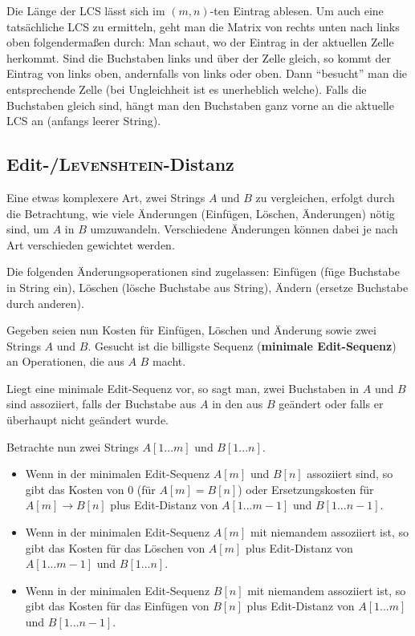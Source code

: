 \linie

Die Länge der LCS lässt sich im $(m, n)$-ten Eintrag ablesen.
Um auch eine tatsächliche LCS zu ermitteln, geht man die Matrix von rechts
unten nach links oben folgendermaßen durch:
Man schaut, wo der Eintrag in der aktuellen Zelle herkommt.
Sind die Buchstaben links und über der Zelle gleich, so kommt der Eintrag
von links oben, andernfalls von links oder oben.
Dann "`besucht"' man die entsprechende Zelle (bei Ungleichheit ist es
unerheblich welche).
Falls die Buchstaben gleich sind, hängt man den Buchstaben ganz vorne
an die aktuelle LCS an (anfangs leerer String).

\subsection{%
    Edit-/\textsc{Levenshtein}-Distanz%
}

Eine etwas komplexere Art, zwei Strings $A$ und $B$ zu vergleichen, erfolgt
durch die Betrachtung, wie viele Änderungen (Einfügen, Löschen, Änderungen)
nötig sind, um $A$ in $B$ umzuwandeln.
Verschiedene Änderungen können dabei je nach Art verschieden gewichtet werden.

Die folgenden Änderungsoperationen sind zugelassen:
Einfügen (füge Buchstabe in String ein),
Löschen (lösche Buchstabe aus String),
Ändern (ersetze Buchstabe durch anderen).

Gegeben seien nun Kosten für Einfügen, Löschen und Änderung sowie
zwei Strings $A$ und $B$.
Gesucht ist die billigste Sequenz
(\textbf{minimale Edit-Sequenz}) an Operationen, die aus $A$ $B$ macht.

\linie

Liegt eine minimale Edit-Sequenz vor, so sagt man, zwei Buchstaben in $A$
und $B$ sind assoziiert, falls der Buchstabe aus $A$ in den aus $B$ geändert
oder falls er überhaupt nicht geändert wurde.

Betrachte nun zwei Strings $A[1 ... m]$ und $B[1 ... n]$.
\begin{itemize}
    \item
    Wenn in der minimalen Edit-Sequenz $A[m]$ und $B[n]$ assoziiert sind,
    so gibt das Kosten von $0$ (für $A[m] = B[n]$) oder Ersetzungskosten für
    $A[m] \rightarrow B[n]$
    plus Edit-Distanz von $A[1 ... m - 1]$ und $B[1 ... n - 1]$.

    \item
    Wenn in der minimalen Edit-Sequenz $A[m]$ mit niemandem assoziiert ist,
    so gibt das Kosten für das Löschen von $A[m]$
    plus Edit-Distanz von $A[1 ... m - 1]$ und $B[1 ... n]$.

    \item
    Wenn in der minimalen Edit-Sequenz $B[n]$ mit niemandem assoziiert ist,
    so gibt das Kosten für das Einfügen von $B[n]$
    plus Edit-Distanz von $A[1 ... m]$ und $B[1 ... n - 1]$.
\end{itemize}

